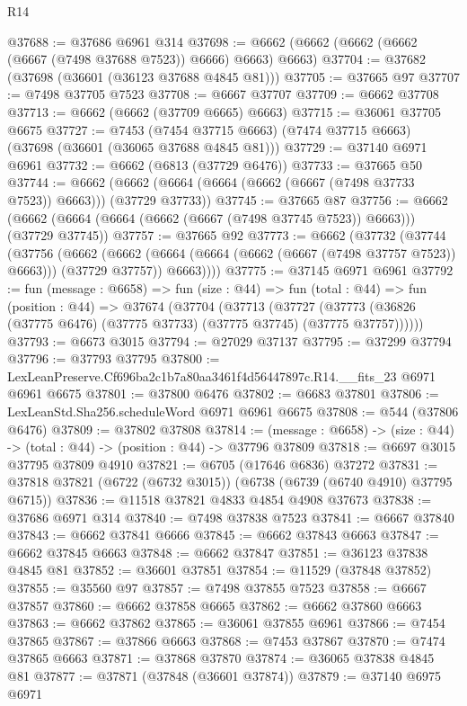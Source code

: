 \begin{lexlean}{R14}
\begin{coremodule}
@37688 := @37686 @6961 @314
@37698 := @6662 (@6662 (@6662 (@6662 (@6667 (@7498 @37688 @7523)) @6666) @6663) @6663)
@37704 := @37682 (@37698 (@36601 (@36123 @37688 @4845 @81)))
@37705 := @37665 @97
@37707 := @7498 @37705 @7523
@37708 := @6667 @37707
@37709 := @6662 @37708
@37713 := @6662 (@6662 (@37709 @6665) @6663)
@37715 := @36061 @37705 @6675
@37727 := @7453
    (@7454 @37715 @6663)
    (@7474 @37715 @6663)
    (@37698 (@36601 (@36065 @37688 @4845 @81)))
@37729 := @37140 @6971 @6961
@37732 := @6662 (@6813 (@37729 @6476))
@37733 := @37665 @50
@37744 := @6662 (@6662 (@6664 (@6664 (@6662 (@6667 (@7498 @37733 @7523)) @6663))) (@37729 @37733))
@37745 := @37665 @87
@37756 := @6662 (@6662 (@6664 (@6664 (@6662 (@6667 (@7498 @37745 @7523)) @6663))) (@37729 @37745))
@37757 := @37665 @92
@37773 := @6662
    (@37732
      (@37744
        (@37756
          (@6662
            (@6662 (@6664 (@6664 (@6662 (@6667 (@7498 @37757 @7523)) @6663))) (@37729 @37757))
            @6663))))
@37775 := @37145 @6971 @6961
@37792 := fun (message : @6658) =>
  fun (size : @44) =>
  fun (total : @44) =>
  fun (position : @44) =>
  @37674
    (@37704
      (@37713
        (@37727 (@37773 (@36826 (@37775 @6476) (@37775 @37733) (@37775 @37745) (@37775 @37757))))))
@37793 := @6673 @3015
@37794 := @27029 @37137
@37795 := @37299 @37794
@37796 := @37793 @37795
@37800 := LexLeanPreserve.Cf696ba2c1b7a80aa3461f4d56447897c.R14.__fits_23 @6971 @6961 @6675
@37801 := @37800 @6476
@37802 := @6683 @37801
@37806 := LexLeanStd.Sha256.scheduleWord @6971 @6961 @6675
@37808 := @544 (@37806 @6476)
@37809 := @37802 @37808
@37814 := (message : @6658) -> (size : @44) -> (total : @44) -> (position : @44) -> @37796 @37809
@37818 := @6697 @3015 @37795 @37809 @4910
@37821 := @6705 (@17646 @6836) @37272
@37831 := @37818 @37821 (@6722 (@6732 @3015)) (@6738 (@6739 (@6740 @4910) @37795 @6715))
@37836 := @11518 @37821 @4833 @4854 @4908 @37673
@37838 := @37686 @6971 @314
@37840 := @7498 @37838 @7523
@37841 := @6667 @37840
@37843 := @6662 @37841 @6666
@37845 := @6662 @37843 @6663
@37847 := @6662 @37845 @6663
@37848 := @6662 @37847
@37851 := @36123 @37838 @4845 @81
@37852 := @36601 @37851
@37854 := @11529 (@37848 @37852)
@37855 := @35560 @97
@37857 := @7498 @37855 @7523
@37858 := @6667 @37857
@37860 := @6662 @37858 @6665
@37862 := @6662 @37860 @6663
@37863 := @6662 @37862
@37865 := @36061 @37855 @6961
@37866 := @7454 @37865
@37867 := @37866 @6663
@37868 := @7453 @37867
@37870 := @7474 @37865 @6663
@37871 := @37868 @37870
@37874 := @36065 @37838 @4845 @81
@37877 := @37871 (@37848 (@36601 @37874))
@37879 := @37140 @6975 @6971

\end{coremodule}
\end{lexlean}
